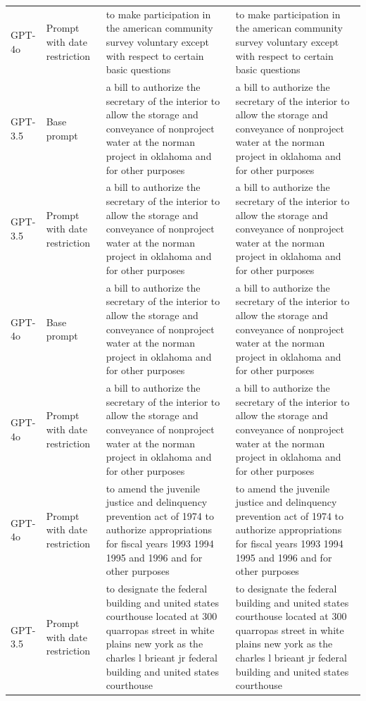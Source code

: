 \begin{longtable}{>{\raggedright\arraybackslash}p{1.4cm}>{\raggedright\arraybackslash}p{1.4cm}>{\raggedright\arraybackslash}p{5.5cm}>{\raggedright\arraybackslash}p{5.5cm}}
GPT-4o & Prompt with date restriction & to make participation in the american community survey voluntary except with respect to certain basic questions & to make participation in the american community survey voluntary except with respect to certain basic questions\\
GPT-3.5 & Base prompt & a bill to authorize the secretary of the interior to allow the storage and conveyance of nonproject water at the norman project in oklahoma and for other purposes & a bill to authorize the secretary of the interior to allow the storage and conveyance of nonproject water at the norman project in oklahoma and for other purposes\\
GPT-3.5 & Prompt with date restriction & a bill to authorize the secretary of the interior to allow the storage and conveyance of nonproject water at the norman project in oklahoma and for other purposes & a bill to authorize the secretary of the interior to allow the storage and conveyance of nonproject water at the norman project in oklahoma and for other purposes\\
GPT-4o & Base prompt & a bill to authorize the secretary of the interior to allow the storage and conveyance of nonproject water at the norman project in oklahoma and for other purposes & a bill to authorize the secretary of the interior to allow the storage and conveyance of nonproject water at the norman project in oklahoma and for other purposes\\
GPT-4o & Prompt with date restriction & a bill to authorize the secretary of the interior to allow the storage and conveyance of nonproject water at the norman project in oklahoma and for other purposes & a bill to authorize the secretary of the interior to allow the storage and conveyance of nonproject water at the norman project in oklahoma and for other purposes\\
GPT-4o & Prompt with date restriction & to amend the juvenile justice and delinquency prevention act of 1974 to authorize appropriations for fiscal years 1993 1994 1995 and 1996 and for other purposes & to amend the juvenile justice and delinquency prevention act of 1974 to authorize appropriations for fiscal years 1993 1994 1995 and 1996 and for other purposes\\
GPT-3.5 & Prompt with date restriction & to designate the federal building and united states courthouse located at 300 quarropas street in white plains new york as the charles l brieant jr federal building and united states courthouse & to designate the federal building and united states courthouse located at 300 quarropas street in white plains new york as the charles l brieant jr federal building and united states courthouse\\

\end{longtable}
